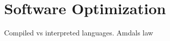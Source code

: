 \section{Software Optimization}
\label{sec:optimization}

Compiled vs interpreted languages. Amdals law
